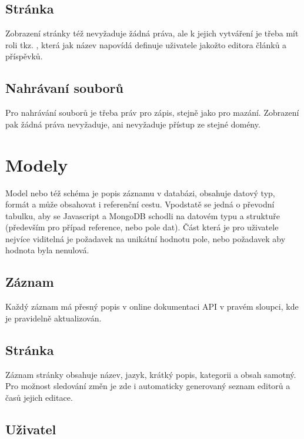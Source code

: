 \subsection{Stránka}
Zobrazení stránky též nevyžaduje žádná práva, ale k jejich vytváření je třeba mít roli tkz. , která
jak název napovídá definuje uživatele jakožto editora článků a příspěvků.
\subsection{Nahrávaní souborů}
Pro nahrávání souborů je třeba práv pro zápis, stejně jako pro mazání.
Zobrazení pak žádná práva nevyžaduje, ani nevyžaduje přístup ze stejné domény.

\section{Modely}
Model nebo též schéma je popis záznamu v databázi, obsahuje datový typ, formát a může obsahovat i
referenční cestu. Vpodstatě se jedná o převodní tabulku, aby se Javascript a MongoDB schodli na datovém typu a
struktuře (především pro případ reference, nebo pole dat). Část která je pro uživatele nejvíce viditelná je 
požadavek na unikátní hodnotu pole, nebo požadavek aby hodnota byla nenulová.
\subsection{Záznam}
Každý záznam má přesný popis v online dokumentaci API v pravém sloupci, kde je pravidelně aktualizován.
\subsection{Stránka}
Záznam stránky obsahuje název, jazyk, krátký popis, kategorii a obsah samotný.
Pro možnost sledování změn je zde i automaticky generovaný seznam editorů a časů jejich editace.
\subsection{Uživatel}
